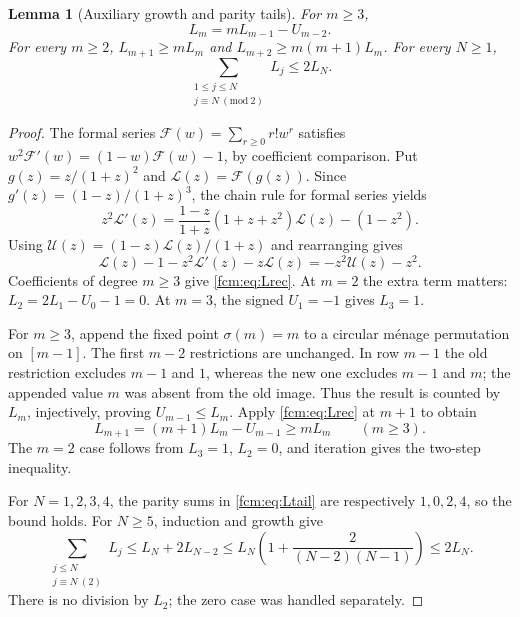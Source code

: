 \documentclass[11pt,letterpaper]{article}
\newtheorem{lemma}[theorem]{Lemma}
\theoremstyle{remark}\newtheorem{remark}[theorem]{Remark}
\begin{document}
\begin{lemma}[Auxiliary growth and parity tails]\label{fcm:lem:TVgrowth}
For $m\ge3$,
\begin{equation}\label{fcm:eq:Lrec}L_m=mL_{m-1}-U_{m-2}.
\end{equation}
For every $m\ge2$, $L_{m+1}\ge mL_m$ and $L_{m+2}\ge m(m+1)L_m$. For every $N\ge1$,
\begin{equation}\label{fcm:eq:Ltail}
 \sum_{\substack{1\le j\le N\\j\equiv N\ (\mathrm{mod}\ 2)}}L_j\le2L_N.
\end{equation}
\end{lemma}
\begin{proof}
The formal series $\mathcal F(w)=\sum_{r\ge0}r!w^r$ satisfies
$w^2\mathcal F'(w)=(1-w)\mathcal F(w)-1$, by coefficient comparison. Put $g(z)=z/(1+z)^2$ and $\mathcal L(z)=\mathcal F(g(z))$. Since $g'(z)=(1-z)/(1+z)^3$, the chain rule for formal series yields
\[
 z^2\mathcal L'(z)=\frac{1-z}{1+z}(1+z+z^2)\mathcal L(z)-(1-z^2).
\]
Using $\mathcal U(z)=(1-z)\mathcal L(z)/(1+z)$ and rearranging gives
\[
 \mathcal L(z)-1-z^2\mathcal L'(z)-z\mathcal L(z)
 =-z^2\mathcal U(z)-z^2.
\]
Coefficients of degree $m\ge3$ give \eqref{fcm:eq:Lrec}. At $m=2$ the extra term matters: $L_2=2L_1-U_0-1=0$. At $m=3$, the signed $U_1=-1$ gives $L_3=1$.

For $m\ge3$, append the fixed point $\sigma(m)=m$ to a circular m\'enage permutation on $[m-1]$. The first $m-2$ restrictions are unchanged. In row $m-1$ the old restriction excludes $m-1$ and $1$, whereas the new one excludes $m-1$ and $m$; the appended value $m$ was absent from the old image. Thus the result is counted by $L_m$, injectively, proving $U_{m-1}\le L_m$. Apply \eqref{fcm:eq:Lrec} at $m+1$ to obtain
\[
 L_{m+1}=(m+1)L_m-U_{m-1}\ge mL_m\qquad(m\ge3).
\]
The $m=2$ case follows from $L_3=1$, $L_2=0$, and iteration gives the two-step inequality.

For $N=1,2,3,4$, the parity sums in \eqref{fcm:eq:Ltail} are respectively $1,0,2,4$, so the bound holds. For $N\ge5$, induction and growth give
\[
 \sum_{\substack{j\le N\\j\equiv N\ (2)}}L_j
 \le L_N+2L_{N-2}
 \le L_N\left(1+\frac{2}{(N-2)(N-1)}\right)\le2L_N.
\]
There is no division by $L_2$; the zero case was handled separately.
\end{proof}
\end{document}
